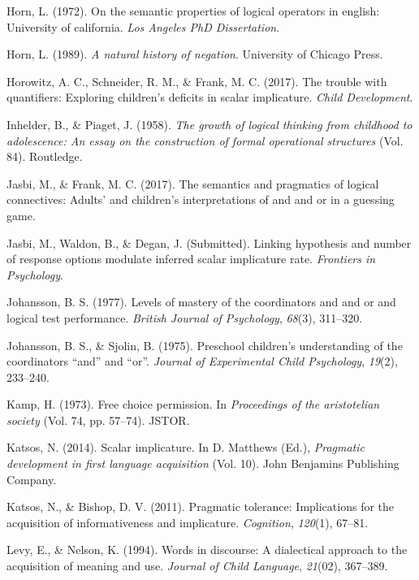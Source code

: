 \documentclass[oneside]{report}
\theoremstyle{definition}
\theoremstyle{definition}
\theoremstyle{definition}
\theoremstyle{remark}
\begin{document}
\hypertarget{ref-horn1972semantic}{}
Horn, L. (1972). On the semantic properties of logical operators in
english: University of california. \emph{Los Angeles PhD Dissertation}.

\hypertarget{ref-horn1989natural}{}
Horn, L. (1989). \emph{A natural history of negation}. University of
Chicago Press.

\hypertarget{ref-horowitz2017trouble}{}
Horowitz, A. C., Schneider, R. M., \& Frank, M. C. (2017). The trouble
with quantifiers: Exploring children's deficits in scalar implicature.
\emph{Child Development}.

\hypertarget{ref-piaget1958growth}{}
Inhelder, B., \& Piaget, J. (1958). \emph{The growth of logical thinking
from childhood to adolescence: An essay on the construction of formal
operational structures} (Vol. 84). Routledge.

\hypertarget{ref-jasbi2017}{}
Jasbi, M., \& Frank, M. C. (2017). The semantics and pragmatics of
logical connectives: Adults' and children's interpretations of and and
or in a guessing game.

\hypertarget{ref-jasbiWaldonDegan2017}{}
Jasbi, M., Waldon, B., \& Degan, J. (Submitted). Linking hypothesis and
number of response options modulate inferred scalar implicature rate.
\emph{Frontiers in Psychology}.

\hypertarget{ref-johansson1977levels}{}
Johansson, B. S. (1977). Levels of mastery of the coordinators and and
or and logical test performance. \emph{British Journal of Psychology},
\emph{68}(3), 311--320.

\hypertarget{ref-johansson1975preschool}{}
Johansson, B. S., \& Sjolin, B. (1975). Preschool children's
understanding of the coordinators ``and'' and ``or''. \emph{Journal of
Experimental Child Psychology}, \emph{19}(2), 233--240.

\hypertarget{ref-kamp1973free}{}
Kamp, H. (1973). Free choice permission. In \emph{Proceedings of the
aristotelian society} (Vol. 74, pp. 57--74). JSTOR.

\hypertarget{ref-katsos2014scalar}{}
Katsos, N. (2014). Scalar implicature. In D. Matthews (Ed.),
\emph{Pragmatic development in first language acquisition} (Vol. 10).
John Benjamins Publishing Company.

\hypertarget{ref-katsos2011pragmatic}{}
Katsos, N., \& Bishop, D. V. (2011). Pragmatic tolerance: Implications
for the acquisition of informativeness and implicature.
\emph{Cognition}, \emph{120}(1), 67--81.

\hypertarget{ref-levy1994words}{}
Levy, E., \& Nelson, K. (1994). Words in discourse: A dialectical
approach to the acquisition of meaning and use. \emph{Journal of Child
Language}, \emph{21}(02), 367--389.
\end{document}
